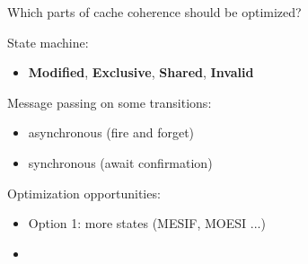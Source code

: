 \begin{frame}[t,fragile]{Which parts of cache coherence should be optimized?}



State machine:
\begin{itemize}
    \item \textbf{Modified}, \textbf{Exclusive}, \textbf{Shared}, \textbf{Invalid}
\end{itemize}

Message passing on some transitions:
\begin{itemize}
    \item asynchronous (fire and forget)
    \item synchronous (await confirmation)
\end{itemize}

Optimization opportunities:
\begin{itemize}
    \item Option 1: more states (MESIF, MOESI ...)
    \item {}
\end{itemize}

\end{frame}


